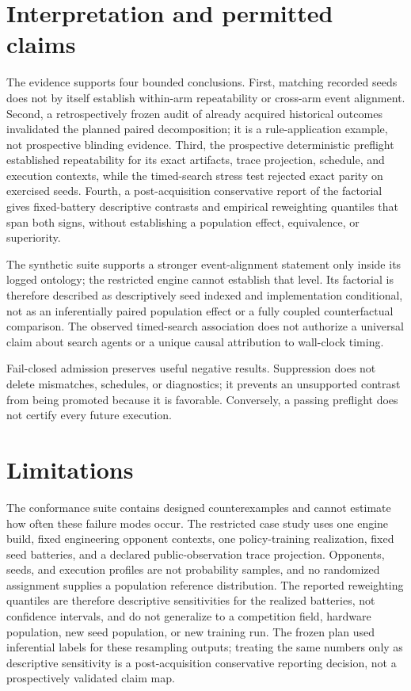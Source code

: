 \documentclass[aps,reprint,superscriptaddress,longbibliography,floatfix]{revtex4-2}
\begin{document}
\section{Interpretation and permitted claims}

The evidence supports four bounded conclusions.  First, matching recorded
seeds does not by itself establish within-arm repeatability or cross-arm event
alignment.  Second, a retrospectively frozen audit of already acquired
historical outcomes invalidated the planned paired decomposition; it is a
rule-application example, not prospective blinding evidence.  Third, the
prospective deterministic preflight established repeatability for its exact
artifacts, trace projection, schedule, and execution contexts, while the
timed-search stress test rejected exact parity on exercised seeds.  Fourth, a
post-acquisition conservative report of the factorial gives fixed-battery
descriptive contrasts and empirical reweighting quantiles that span both
signs, without establishing a population effect, equivalence, or superiority.

The synthetic suite supports a stronger event-alignment statement only inside
its logged ontology; the restricted engine cannot establish that level.  Its
factorial is therefore described as descriptively seed indexed and
implementation conditional, not as an inferentially paired population effect
or a fully coupled counterfactual comparison.  The observed timed-search
association does not authorize a universal claim about search agents or a
unique causal attribution to wall-clock timing.

Fail-closed admission preserves useful negative results.  Suppression does not
delete mismatches, schedules, or diagnostics; it prevents an unsupported
contrast from being promoted because it is favorable.  Conversely, a passing
preflight does not certify every future execution.

\section{Limitations}

The conformance suite contains designed counterexamples and cannot estimate
how often these failure modes occur.  The restricted case study uses one
engine build, fixed engineering opponent contexts, one policy-training
realization, fixed seed batteries, and a declared public-observation trace
projection.  Opponents, seeds, and execution profiles are not probability
samples, and no randomized assignment supplies a population reference
distribution.  The reported reweighting quantiles are therefore descriptive
sensitivities for the realized batteries, not confidence intervals, and do not
generalize to a competition field, hardware population, new seed population,
or new training run.  The frozen plan used inferential labels for these
resampling outputs; treating the same numbers only as descriptive sensitivity
is a post-acquisition conservative reporting decision, not a prospectively
validated claim map.
\end{document}
